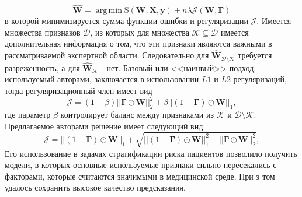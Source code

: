 \documentclass[12pt, twoside]{article}
\newcommand{\X}{\mathbf{X}}
\newcommand{\w}{{\mathbf{W}}}
\DeclareMathOperator*{\argmin}{arg\,min}
\begin{document}
\begin{equation}\label{eq1}
\hat{\mathbf{\w}} = \argmin\text{S}(\w,\X,\mathbf{y})+n\lambda\mathcal{J}(\w,\mathbf{\Gamma})
\end{equation}
в которой минимизируется сумма функции ошибки и регуляризации $\mathcal{J}$. Имеется множества признаков $\mathcal{D}$, из которых для множества $\mathcal{K}\subseteq\mathcal{D}$ имеется дополнительная информация о том, что эти признаки являются важными в рассматриваемой экспертной области. Следовательно для $\hat{\mathbf{\w}}_{\mathcal{D}\setminus\mathcal{K}}$ требуется разреженность, а для $\hat{\mathbf{\w}}_{\mathcal{K}}$ - нет. Базовый или <<наинвый>> подход, используемый авторами, заключается в использовании $L1$ и $L2$ регуляризаций, тогда регуляризационный член имеет вид
\begin{equation}\label{eq2}
\mathcal{J} = (1-\beta)||\mathbf{\Gamma}\odot\w||^2_2+\beta||(1-\mathbf{\Gamma})\odot\w||_1,
\end{equation}
где параметр $\beta$ контролирует баланс между признаками из $\mathcal{K}$ и $\mathcal{D}\setminus\mathcal{K}$. Предлагаемое авторами решение имеет следующий вид
\begin{equation}\label{eq3}
\mathcal{J} = ||(1-\mathbf{\Gamma})\odot\w||_1 + \sqrt{ ||(1-\mathbf{\Gamma})\odot\w||^2_1+||\mathbf{\Gamma}\odot\w||^2_2},
\end{equation}
Его  использование в задачах стратификации риска пациентов позволило получить модели, в которых основные используемые признаки сильно пересекались с факторами, которые считаются значимыми в медицинской среде. При э том удалось сохранить высокое качество предсказания.
\end{document}
